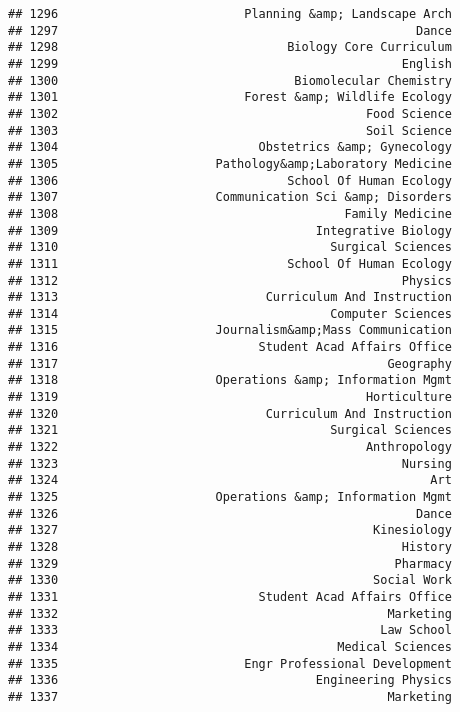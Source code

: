 \documentclass[
]{article}
\begin{document}
\begin{verbatim}
## 1296                          Planning &amp; Landscape Arch
## 1297                                                  Dance
## 1298                                Biology Core Curriculum
## 1299                                                English
## 1300                                 Biomolecular Chemistry
## 1301                          Forest &amp; Wildlife Ecology
## 1302                                           Food Science
## 1303                                           Soil Science
## 1304                            Obstetrics &amp; Gynecology
## 1305                      Pathology&amp;Laboratory Medicine
## 1306                                School Of Human Ecology
## 1307                      Communication Sci &amp; Disorders
## 1308                                        Family Medicine
## 1309                                    Integrative Biology
## 1310                                      Surgical Sciences
## 1311                                School Of Human Ecology
## 1312                                                Physics
## 1313                             Curriculum And Instruction
## 1314                                      Computer Sciences
## 1315                      Journalism&amp;Mass Communication
## 1316                            Student Acad Affairs Office
## 1317                                              Geography
## 1318                      Operations &amp; Information Mgmt
## 1319                                           Horticulture
## 1320                             Curriculum And Instruction
## 1321                                      Surgical Sciences
## 1322                                           Anthropology
## 1323                                                Nursing
## 1324                                                    Art
## 1325                      Operations &amp; Information Mgmt
## 1326                                                  Dance
## 1327                                            Kinesiology
## 1328                                                History
## 1329                                               Pharmacy
## 1330                                            Social Work
## 1331                            Student Acad Affairs Office
## 1332                                              Marketing
## 1333                                             Law School
## 1334                                       Medical Sciences
## 1335                          Engr Professional Development
## 1336                                    Engineering Physics
## 1337                                              Marketing

\end{verbatim}
\end{document}
